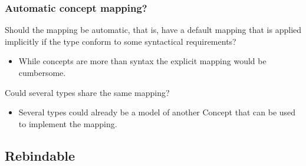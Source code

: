 \documentclass[xcolor=dvipsnames]{beamer}
\begin{document}
\begin{frame}[fragile]
\frametitle{Automatic concept mapping?}

Should the mapping be automatic, that is, have a default mapping that is applied implicitly if the type conform to some syntactical requirements? 

\begin{itemize}
  \item While concepts are more than syntax the explicit mapping would be cumbersome. 
\end{itemize}

Could several types share the same mapping?

\begin{itemize}
  \item Several types could already be a model of another Concept that can be used to implement the mapping. 
\end{itemize}


\end{frame}
\subsection{Rebindable}
\end{document}
